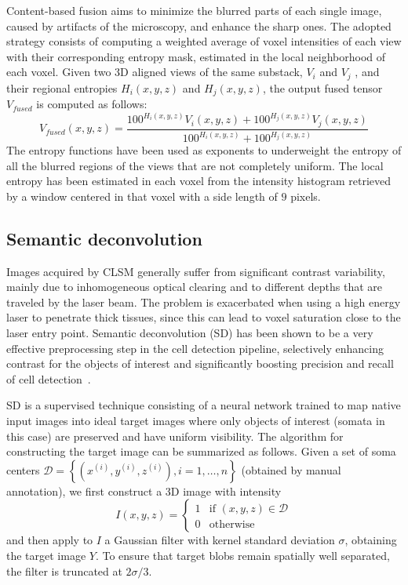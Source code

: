 \documentclass[smallextended]{svjour3}       %
\begin{document}
Content-based fusion aims to minimize the blurred
parts of each single image, caused by artifacts of the microscopy, and
enhance the sharp ones. The adopted strategy consists of computing a
weighted average of voxel intensities of each view with their
corresponding entropy mask, estimated in the local neighborhood of
each voxel. Given two 3D aligned views of the same substack, $V_i$ and
$V_j$ , and their regional entropies $H_i(x,y,z)$ and $H_j(x,y,z)$,
the output fused tensor $V_{fused}$ is computed as follows:
\begin{equation}
V_{fused}(x,y,z)=\frac{100^{H_i(x,y,z)}V_i(x,y,z) + 100^{H_j(x,y,z)}V_j(x,y,z)}{100^{H_i(x,y,z)} + 100^{H_j(x,y,z)}}
\end{equation}
The entropy functions have been used as exponents to underweight the
entropy of all the blurred regions of the views that are not
completely uniform. The local entropy has been estimated in each voxel
from the intensity histogram retrieved by a window centered in that voxel
with a side length of $9$ pixels.


\subsection{Semantic deconvolution}
\label{sec:semantic}
Images acquired by CLSM generally suffer from significant contrast
variability, mainly due to inhomogeneous optical clearing and to
different depths that are traveled by the laser beam.  The problem is
exacerbated when using a high energy laser to penetrate thick tissues, since this can lead to voxel saturation close to
the laser entry point.
Semantic deconvolution (SD) has been shown to be a very effective preprocessing
step in the cell detection pipeline, selectively enhancing contrast
for the objects of interest and significantly boosting precision and
recall of cell detection~\cite{frasconi_large-scale_2014}.

SD is a supervised technique consisting of a neural network trained to
map native input images into ideal target images where only objects of
interest (somata in this case) are preserved and have uniform
visibility.  The algorithm for constructing the target image can be
summarized as follows. Given a set of soma centers
$\mathcal{D} = \left\{(x^{(i)}, y^{(i)}, z^{(i)}), i=1,\dots,n
\right\}$
(obtained by manual annotation), we first construct a 3D image with
intensity
$$
I(x,y,z) = \left\{
  \begin{array}{ll}
    1 & \mbox{if $(x,y,z) \in \mathcal{D}$}\\
    0 & \mbox{otherwise}
  \end{array}
\right.
$$
and then apply to $I$ a Gaussian filter with kernel standard
deviation $\sigma$, obtaining the target image $Y$. To ensure that
target blobs remain spatially well separated, the filter is truncated
at $2\sigma/3$.
\end{document}

